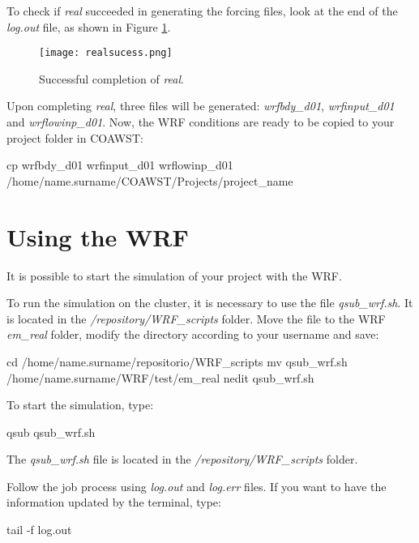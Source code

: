  To check if \textit{real} succeeded in generating the forcing files, look at the end of the \textit{log.out} file, as shown in Figure \textcolor{bleu_cite}{\ref{realfinish}}.
\bigskip

\begin{figure}[H]
    \centering
    \texttt{[image: realsucess.png]}
    \caption{Successful completion of \textit{real}.}
    \label{realfinish}
\end{figure}
\bigskip

 Upon completing \textit{real}, three files will be generated: \textit{wrfbdy\_d01}, \textit{wrfinput\_d01} and 
\textit{wrflowinp\_d01}. Now, the WRF conditions are ready to be copied to your project
folder in COAWST:
\bigskip

\begin{bashcode}[fontsize=\scriptsize]
cp wrfbdy_d01 wrfinput_d01 wrflowinp_d01 /home/name.surname/COAWST/Projects/project_name
\end{bashcode}
\bigskip

\section{Using the WRF}\label{wrfsecao2}
\bigskip

 It is possible to start the simulation of your project with the WRF.
\bigskip

 To run the simulation on the cluster, it is necessary to use the file \textit{qsub\_wrf.sh}. It is located in the 
\textit{/repository/WRF\_scripts} folder. Move the file to the WRF \textit{em\_real} folder, modify the directory according
to your username and save:
\bigskip

\begin{bashcode}
cd /home/name.surname/repositorio/WRF_scripts
mv qsub_wrf.sh /home/name.surname/WRF/test/em_real
nedit qsub_wrf.sh
\end{bashcode}
\bigskip

 To start the simulation, type:
\bigskip

\begin{bashcode}
qsub qsub_wrf.sh
\end{bashcode}
\bigskip

\begin{tcolorbox}[enhanced,
  grow to left by=0cm,%
  grow to right by=0cm,%
  enlarge top by=0cm,%
  enlarge bottom by=0cm,%
  tcbox raise base,
  boxrule=1.0pt,
  left=18mm,
  colframe=yellow!50!black,coltext=yellow!25!black,colback=yellow!10!white,
  overlay={\begin{tcbclipinterior}\fill[yellow!75!blue!50!white] (frame.south west)
    rectangle node[text=white,font=\sffamily\bfseries\footnotesize,rotate=0] {ATTENTION} ([xshift=18mm]frame.north west);\end{tcbclipinterior}}]
The \textit{qsub\_wrf.sh} file is located in the \textit{/repository/WRF\_scripts} folder.
\end{tcolorbox}
\bigskip

 Follow the job process using \textit{log.out} and \textit {log.err} files. If you want to have the information 
updated by the terminal, type:
\bigskip

\begin{bashcode}
tail -f log.out
\end{bashcode}
\bigskip
